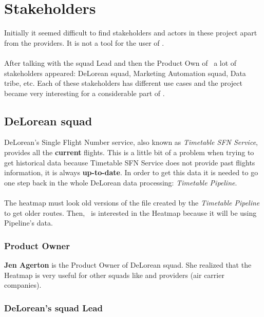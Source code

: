 
\chapter{Stakeholders}

\label{chapter04}

Initially it seemed difficult to find stakeholders and actors in these project apart from the providers. It is not a tool for the user of \company.
\\\\
After talking with the squad Lead and then the Product Own of \squad\ a lot of stakeholders appeared: DeLorean squad, Marketing Automation squad, Data tribe, etc. Each of these stakeholders has different use cases and the project became very interesting for a considerable part of \company.

\section{DeLorean squad} \label{dlr}

DeLorean's Single Flight Number service, also known as \textit{Timetable SFN Service}, provides all the \textbf{current} flights. This is a little bit of a problem when trying to get historical data because Timetable SFN Service does not provide past flights information, it is always \textbf{up-to-date}. In order to get this data it is needed to go one step back in the whole DeLorean data processing: \textit{Timetable Pipeline}.
\\\\
The heatmap must look old versions of the file created by the \textit{Timetable Pipeline} to get older routes. Then, \squad\ is interested in the Heatmap because it will be using Pipeline's data.

\subsection{Product Owner} \label{product_owner}

\textbf{Jen Agerton} is the Product Owner of DeLorean squad. She realized that the Heatmap is very useful for other squads like  and providers (air carrier companies).

\subsection{DeLorean's squad Lead}

